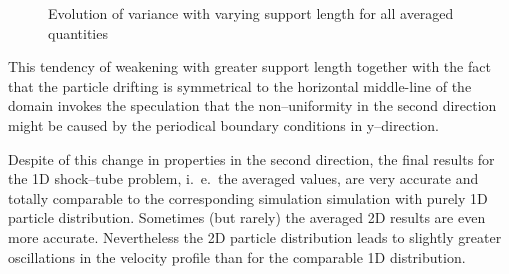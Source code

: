 \documentclass{report}
\begin{document}
\begin{figure}[!htbp]
\centering
\label{fig:2DSPHresults_CS_varianceVersusSuplen}

\caption[]{Evolution of variance with varying support length for all averaged quantities}

\end{figure}

This tendency of weakening with greater support length together with the fact that the particle drifting is symmetrical to the horizontal middle-line of the domain invokes the speculation that the non--uniformity in the second direction might be caused by the periodical boundary conditions in y--direction.


 
Despite of this change in properties in the second direction, the final results for the 1D shock--tube problem, i.\ e.\ the averaged values, are very accurate and totally comparable to the corresponding simulation simulation with purely 1D particle distribution. Sometimes (but rarely) the averaged 2D results are even more accurate.
Nevertheless the 2D particle distribution leads to slightly greater oscillations in the velocity profile than for the comparable 1D distribution.
 
\end{document}
